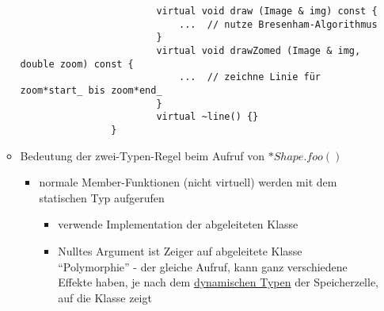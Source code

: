 \documentclass{article}
\begin{document}
\begin{itemize}
\begin{itemize}
\begin{lstlisting}
						virtual void draw (Image & img) const {
							...  // nutze Bresenham-Algorithmus
						}
						virtual void drawZomed (Image & img, double zoom) const {
							...  // zeichne Linie für zoom*start_ bis zoom*end_
						}
						virtual ~line() {}
				}
			\end{lstlisting}
			\item Bedeutung der zwei-Typen-Regel beim Aufruf von $*Shape.foo()$
			\begin{itemize}
				\item normale Member-Funktionen (nicht virtuell) werden mit dem statischen Typ aufgerufen
				\begin{itemize}
					\item verwende Implementation der abgeleiteten Klasse
					\item Nulltes Argument ist Zeiger auf abgeleitete Klasse \\
					``Polymorphie'' - der gleiche Aufruf, kann ganz verschiedene Effekte haben, je nach dem \underline{dynamischen Typen} der Speicherzelle, auf die Klasse zeigt
				\end{itemize}
			\end{itemize}
		\end{itemize}
	\end{itemize}
\end{document}
